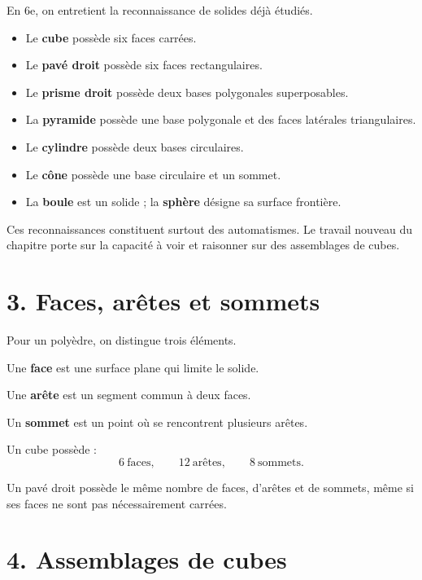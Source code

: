 En 6e, on entretient la reconnaissance de solides déjà étudiés.

\begin{itemize}
\item Le \textbf{cube} possède six faces carrées.
\item Le \textbf{pavé droit} possède six faces rectangulaires.
\item Le \textbf{prisme droit} possède deux bases polygonales superposables.
\item La \textbf{pyramide} possède une base polygonale et des faces latérales triangulaires.
\item Le \textbf{cylindre} possède deux bases circulaires.
\item Le \textbf{cône} possède une base circulaire et un sommet.
\item La \textbf{boule} est un solide ; la \textbf{sphère} désigne sa surface frontière.
\end{itemize}

\begin{remarque}
Ces reconnaissances constituent surtout des automatismes. Le travail nouveau du chapitre porte sur la capacité à voir et raisonner sur des assemblages de cubes.
\end{remarque}

\section{3. Faces, arêtes et sommets}

Pour un polyèdre, on distingue trois éléments.

\begin{definition}
Une \textbf{face} est une surface plane qui limite le solide.

Une \textbf{arête} est un segment commun à deux faces.

Un \textbf{sommet} est un point où se rencontrent plusieurs arêtes.
\end{definition}

Un cube possède :
\[
6\ \text{faces},\qquad 12\ \text{arêtes},\qquad 8\ \text{sommets}.
\]

Un pavé droit possède le même nombre de faces, d'arêtes et de sommets, même si ses faces ne sont pas nécessairement carrées.

\section{4. Assemblages de cubes}

